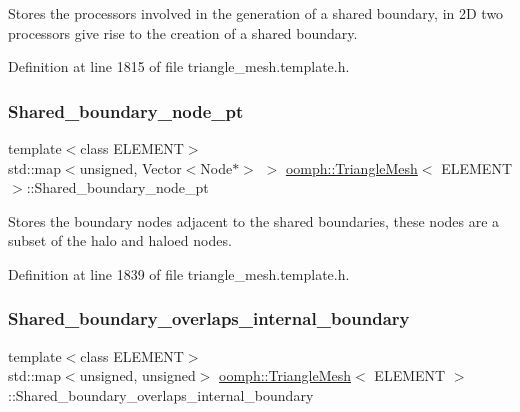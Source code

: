 Stores the processors involved in the generation of a shared boundary, in 2D two processors give rise to the creation of a shared boundary. 



Definition at line 1815 of file triangle\+\_\+mesh.\+template.\+h.

\mbox{\label{classoomph_1_1TriangleMesh_a73973f1a76bb9ff555e75b727c676d82}} 
\subsubsection{\texorpdfstring{Shared\+\_\+boundary\+\_\+node\+\_\+pt}{Shared\_boundary\_node\_pt}}
{\footnotesize\ttfamily template$<$class E\+L\+E\+M\+E\+NT$>$ \\
std\+::map$<$unsigned, Vector$<$Node$\ast$$>$ $>$ \hyperlink{classoomph_1_1TriangleMesh}{oomph\+::\+Triangle\+Mesh}$<$ E\+L\+E\+M\+E\+NT $>$\+::Shared\+\_\+boundary\+\_\+node\+\_\+pt\hspace{0.3cm}{\ttfamily [protected]}}



Stores the boundary nodes adjacent to the shared boundaries, these nodes are a subset of the halo and haloed nodes. 



Definition at line 1839 of file triangle\+\_\+mesh.\+template.\+h.

\mbox{\label{classoomph_1_1TriangleMesh_a1ac1fe24d9985f3e778b1362f00d2949}} 
\subsubsection{\texorpdfstring{Shared\+\_\+boundary\+\_\+overlaps\+\_\+internal\+\_\+boundary}{Shared\_boundary\_overlaps\_internal\_boundary}}
{\footnotesize\ttfamily template$<$class E\+L\+E\+M\+E\+NT$>$ \\
std\+::map$<$unsigned, unsigned$>$ \hyperlink{classoomph_1_1TriangleMesh}{oomph\+::\+Triangle\+Mesh}$<$ E\+L\+E\+M\+E\+NT $>$\+::Shared\+\_\+boundary\+\_\+overlaps\+\_\+internal\+\_\+boundary\hspace{0.3cm}{\ttfamily [protected]}}



